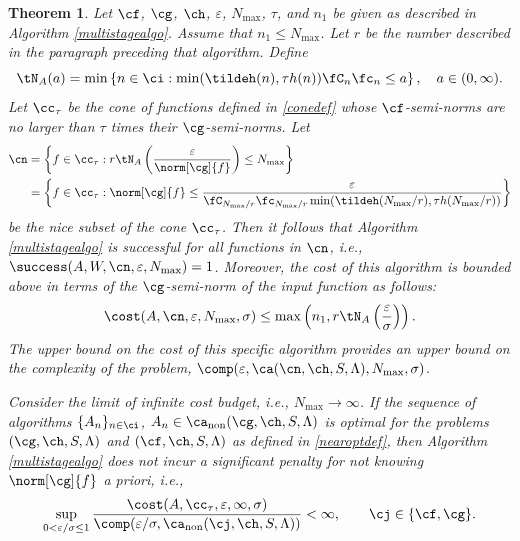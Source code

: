 \documentclass[]{elsarticle}
\DeclareMathOperator{\fix}{non}
\newtheorem{theorem}{Theorem}
\theoremstyle{definition}
\theoremstyle{remark}
\begin{document}
\begin{theorem}  \label{MultiStageThm}  Let  $\cf$, $\cg$, $\ch$, $\varepsilon$, $N_{\max}$, $\tau$, and $n_1$ be given as described in Algorithm \ref{multistagealgo}. Assume that $n_1 \le N_{\max}$. Let $r$ be the number described in the paragraph preceding that algorithm.  Define 
\[
\tN_A(a) = \min\left\{ n \in \ci : \min(\tildeh(n),\tau h(n))\fC_n\fc_n \le a \right\}, \quad a \in (0,\infty).
\]
Let $\cc_\tau$ be the cone of functions defined in \eqref{conedef} whose $\cf$-semi-norms are no larger than $\tau$ times their $\cg$-semi-norms.  Let
\begin{align} 
\nonumber
\cn &= \left \{ f \in \cc_\tau :r\tN_{A}\left(\frac{\varepsilon}{\norm[\cg]{f}} \right) \le N_{\max} \right\} \\
\label{nicefdefmulti}
&= \left \{ f \in \cc_\tau : \norm[\cg]{f} \le \frac{\varepsilon}{\fC_{N_{\max}/r} \fc_{N_{\max}/r} \min(\tildeh(N_{\max}/r),\tau h(N_{\max}/r))} \right\}
\end{align}
be the nice subset of the cone $\cc_\tau$.  Then it follows that Algorithm \ref{multistagealgo} is successful for all functions in $\cn$,  i.e.,  $\success(A,W,\cn,\varepsilon,N_{\max}) = 1$.  Moreover, the cost of this algorithm is bounded above in terms of the $\cg$-semi-norm of the input function as follows:
\begin{equation} \label{automultistagedetcost}
\cost(A,\cn,\varepsilon,N_{\max},\sigma)
\le \max \left(n_1, r\tN_{A}\left(\frac{\varepsilon}{\sigma} \right) \right).
\end{equation}
The upper bound on the cost of this specific algorithm provides an upper bound on the complexity of the problem, $\comp(\varepsilon,\ca(\cn,\ch,S,\Lambda),N_{\max},\sigma)$.  

Consider the limit of infinite cost budget, i.e., $N_{\max} \to \infty$.  If the sequence of algorithms $\{A_n\}_{n \in \ci}$, $A_n \in\ca_{\fix}(\cg,\ch,S,\Lambda)$  is optimal for the problems $(\cg,\ch,S,\Lambda)$ and $(\cf,\ch,S,\Lambda)$ as defined in \eqref{nearoptdef}, then Algorithm \ref{multistagealgo} does not incur a significant penalty for not knowing $\norm[\cg]{f}$ a priori, i.e.,
\begin{equation*} \label{multistagepenalty}
\sup_{0 < \varepsilon/\sigma \le 1} \frac{\cost(A,\cc_{\tau},\varepsilon,\infty,\sigma)} {\comp(\varepsilon/\sigma,\ca_{\fix}(\cj,\ch,S,\Lambda))} <\infty, \qquad \cj \in \{\cf,\cg\}.
\end{equation*}
\end{theorem}
\end{document}
